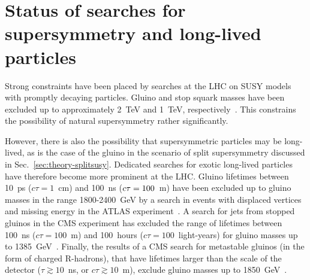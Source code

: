 \section{Status of searches for supersymmetry and long-lived particles}
\label{sec:theory-status}
Strong constraints have been placed by searches at the LHC on SUSY models with 
promptly decaying particles. Gluino and stop squark masses have been excluded 
up to approximately 2~TeV and 1~TeV, 
respectively~\cite{mt236,ra2b36,stop0L36,stop1L36,stop2L36}. 
This constrains the possibility of natural supersymmetry rather significantly.

However, there is also the possibility that supersymmetric particles may be 
long-lived, as is the case of the gluino in the scenario of split supersymmetry 
discussed in Sec.~\ref{sec:theory-splitsusy}. Dedicated searches for exotic 
long-lived particles have therefore become more prominent at the LHC. Gluino 
lifetimes between 10~ps ($c\tau=1$~cm) and 100~ns ($c\tau=100$~m) have been 
excluded up to gluino masses in the range 1800-2400~GeV by a search in events 
with displaced vertices and missing energy in the ATLAS 
experiment~\cite{dispvert-atlas}. A search for jets from stopped gluinos in the 
CMS experiment has excluded the range of lifetimes between 100~ns 
($c\tau=100$~m) and 100~hours ($c\tau=100$~light-years) for gluino masses up to 
1385~GeV~\cite{stoppedgluino-cms}. Finally, the results of a CMS search for 
metastable gluinos (in the form of charged R-hadrons), that have lifetimes 
larger than the scale of the detector ($\tau \gtrsim 10$~ns, or $c\tau \gtrsim 
10$~m), exclude gluino masses up to 1850~GeV~\cite{hscp-cms}.

